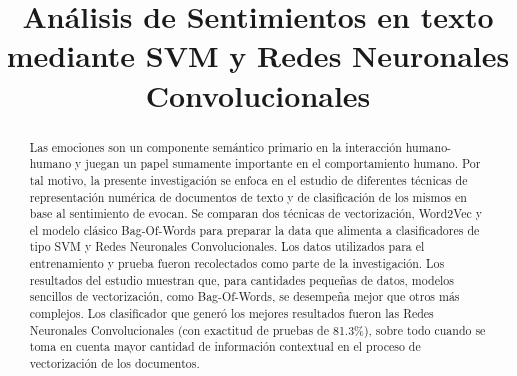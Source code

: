 \documentclass[conference]{IEEEtran}
\begin{document}
	


\title{
	Análisis de Sentimientos en texto mediante SVM y Redes Neuronales Convolucionales
}

\author{
}

\maketitle




\begin{abstract}

	Las emociones son un componente semántico primario en la interacción humano-humano y juegan un papel sumamente importante en el comportamiento humano. Por tal motivo, la presente investigación se enfoca en el estudio de diferentes técnicas de representación numérica de documentos de texto y de clasificación de los mismos en base al sentimiento de evocan. Se comparan dos técnicas de vectorización, Word2Vec y el modelo clásico Bag-Of-Words para preparar la data que alimenta a clasificadores de tipo SVM y Redes Neuronales Convolucionales. Los datos utilizados para el entrenamiento y prueba fueron recolectados como parte de la investigación. Los resultados del estudio muestran que, para cantidades pequeñas de datos, modelos sencillos de vectorización, como Bag-Of-Words, se desempeña mejor que otros más complejos. Los clasificador que generó los mejores resultados fueron las Redes Neuronales Convolucionales (con exactitud de pruebas de 81.3\%), sobre todo cuando se toma en cuenta mayor cantidad de información contextual en el proceso de vectorización de los documentos.

\end{abstract}
\end{document}
